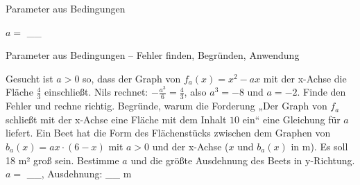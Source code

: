 \begin{aufgabe}{Parameter aus Bedingungen}
\begin{teile}
\begin{ksys}[xmin=-1,xmax=6,ymin=-1,ymax=11] \end{ksys}
$a =$ \_\_
\end{teile}
\end{aufgabe}

\begin{aufgabe}{Parameter aus Bedingungen – Fehler finden, Begründen, Anwendung}
\begin{teile}
\teil Gesucht ist $a > 0$ so, dass der Graph von $f_a(x) = x^2 - a x$ mit der x-Achse die Fläche $\frac{4}{3}$ einschließt. Nils rechnet: $-\frac{a^3}{6} = \frac{4}{3}$, also $a^3 = -8$ und $a = -2$. Finde den Fehler und rechne richtig.
\teil Begründe, warum die Forderung „Der Graph von $f_a$ schließt mit der x-Achse eine Fläche mit dem Inhalt $10$ ein“ eine Gleichung für $a$ liefert.
\teil Ein Beet hat die Form des Flächenstücks zwischen dem Graphen von $b_a(x) = a x \cdot (6 - x)$ mit $a > 0$ und der x-Achse ($x$ und $b_a(x)$ in m). Es soll 18 m² groß sein. Bestimme $a$ und die größte Ausdehnung des Beets in y-Richtung. $a =$ \_\_, Ausdehnung: \_\_ m
\end{teile}
\end{aufgabe}
